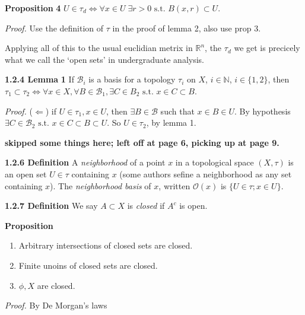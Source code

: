 \documentclass[12pt]{article}
\newcommand{\st}[0]{ \textrm{ s.t. } }
\newcommand{\limply}[0] { \Leftarrow }
\newcommand{\lrimply}[0] { \Leftrightarrow }
\newcommand{\nats}[0] { \mathbb{N}}
\newcommand{\reals}[0] { \mathbb{R}}
\newcommand{\B}[0] { \mathcal{B} }
\newcommand{\curlyO}[0] { \mathcal{O} }
\begin{document}
\begin{flushleft}
 { \bf Proposition }{ \bf 4 }$U \in \tau_d \lrimply \forall x \in U \; \exists r>0 \st B(x,r) \subset U$.\begin{flushleft} 
 \emph{Proof.  }Use the definition of $\tau$ in the proof of lemma 2, also use prop 3.\end{flushleft}\end{flushleft}\begin{flushleft} 
 Applying all of this to the usual euclidian metrix in $\reals^n$, the $\tau_d$ we get is precicely what we call the `open sets' in undergraduate analysis.\end{flushleft}\begin{flushleft} 
 { \bf 1.2.4 Lemma }{ \bf 1 }If $\B_i$ is a basis for a topology $\tau_i$ on $X$, $i \in \nats$, $i \in \{1,2\}$, then $\tau_1 \subset \tau_2 \lrimply \forall x \in X, \forall B \in \B_1, \exists C \in B_2 \st x \in C \subset B$.\begin{flushleft} 
 \emph{Proof.  }($\limply$) if $U \in \tau_1, x \in U$, then $\exists B \in \B$ such that $x \in B \in U$. By hypothesis $\exists C \in \B_2 \st x \in C \subset B \subset U$. So $U \in \tau_2$, by lemma 1.\end{flushleft}\end{flushleft}{ \bf skipped some things here; left off at page 6, picking up at page 9.}\begin{flushleft} 
 { \bf 1.2.6 Definition }A \emph{neighborhood} of a point $x$ in a topological space $(X, \tau)$ is an open set $U \in \tau$ containing $x$ (some authors sefine a neighborhood as any set containing $x$). The \emph{neighborhood basis} of $x$, written $\curlyO(x)$ is $\{ U \in \tau; x \in U\}$.\end{flushleft}\begin{flushleft} 
 { \bf 1.2.7 Definition }We say $A \subset X$ is \emph{closed} if $A^c$ is open.\end{flushleft}\begin{flushleft} 
 { \bf Proposition }\begin{enumerate}
\item
                Arbitrary intersections of closed sets are closed.
            \item
                Finite unoins of closed sets are closed.
            \item
                $\phi, X$ are closed.
            \end{enumerate}\begin{flushleft} 
 \emph{Proof.  }By De Morgan's laws\end{flushleft}\end{flushleft}\begin{flushleft} 

\end{flushleft}
\end{document}
